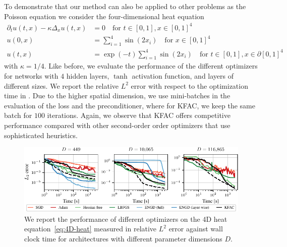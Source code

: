 To demonstrate that our method can also be applied to other problems as the Poisson equation we consider the four-dimensional heat equation
\begin{align}\label{eq:4D-heat}
     \partial_t u(t,x)-\kappa\Delta_x u(t,x) & = 0 \quad \text{for } t\in[0,1], x\in [0,1]^{4} \\
    u(0,x) & = \sum_{i=1}^{4} \sin(2 x_i) \quad \text{for }
     x\in [0,1]^{4}
     \\
     u(t,x) & = \exp(-t) \sum_{i=1}^{4} \sin(2 x_i) \quad \text{for } t\in[0,1], x\in\partial[0,1]^{4}
\end{align}
with $\kappa = 1/4$. Like before, we evaluate the performance of the different optimizers for networks with $4$ hidden layers, $\tanh$ activation function, and layers of different sizes.
We report the relative $L^2$ error with respect to the optimization time in .
Due to the higher spatial dimension, we use mini-batches in the evaluation of the loss and the preconditioner, where for KFAC, we keep the same batch for $100$ iterations. 
Again, we observe that KFAC offers competitive performance compared with other second-order order optimizers that use sophisticated heuristics. 
\begin{figure}
    \centering
    \includegraphics{../kfac_pinns_exp/exp30_heat4d_groupplot/l2_error_over_time.pdf}
    \caption{We report the performance of different optimizers on the 4D heat equation~\eqref{eq:4D-heat} measured in relative $L^2$ error against wall clock time for architectures with different parameter dimensions $D$.}
    \label{fig:4D-heat}
\end{figure}



